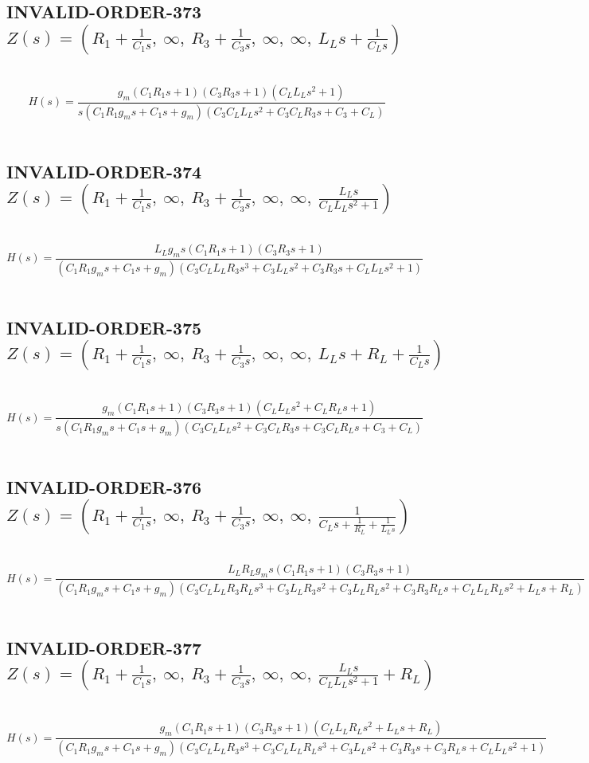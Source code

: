 \documentclass{article}
\begin{document}
\subsection{INVALID-ORDER-373 $Z(s) = \left( R_{1} + \frac{1}{C_{1} s}, \  \infty, \  R_{3} + \frac{1}{C_{3} s}, \  \infty, \  \infty, \  L_{L} s + \frac{1}{C_{L} s}\right)$ } \ 
\textbf{\[H(s) = \frac{g_{m} \left(C_{1} R_{1} s + 1\right) \left(C_{3} R_{3} s + 1\right) \left(C_{L} L_{L} s^{2} + 1\right)}{s \left(C_{1} R_{1} g_{m} s + C_{1} s + g_{m}\right) \left(C_{3} C_{L} L_{L} s^{2} + C_{3} C_{L} R_{3} s + C_{3} + C_{L}\right)}\] } \ 
\subsection{INVALID-ORDER-374 $Z(s) = \left( R_{1} + \frac{1}{C_{1} s}, \  \infty, \  R_{3} + \frac{1}{C_{3} s}, \  \infty, \  \infty, \  \frac{L_{L} s}{C_{L} L_{L} s^{2} + 1}\right)$ } \ 
\textbf{\[H(s) = \frac{L_{L} g_{m} s \left(C_{1} R_{1} s + 1\right) \left(C_{3} R_{3} s + 1\right)}{\left(C_{1} R_{1} g_{m} s + C_{1} s + g_{m}\right) \left(C_{3} C_{L} L_{L} R_{3} s^{3} + C_{3} L_{L} s^{2} + C_{3} R_{3} s + C_{L} L_{L} s^{2} + 1\right)}\] } \ 
\subsection{INVALID-ORDER-375 $Z(s) = \left( R_{1} + \frac{1}{C_{1} s}, \  \infty, \  R_{3} + \frac{1}{C_{3} s}, \  \infty, \  \infty, \  L_{L} s + R_{L} + \frac{1}{C_{L} s}\right)$ } \ 
\textbf{\[H(s) = \frac{g_{m} \left(C_{1} R_{1} s + 1\right) \left(C_{3} R_{3} s + 1\right) \left(C_{L} L_{L} s^{2} + C_{L} R_{L} s + 1\right)}{s \left(C_{1} R_{1} g_{m} s + C_{1} s + g_{m}\right) \left(C_{3} C_{L} L_{L} s^{2} + C_{3} C_{L} R_{3} s + C_{3} C_{L} R_{L} s + C_{3} + C_{L}\right)}\] } \ 
\subsection{INVALID-ORDER-376 $Z(s) = \left( R_{1} + \frac{1}{C_{1} s}, \  \infty, \  R_{3} + \frac{1}{C_{3} s}, \  \infty, \  \infty, \  \frac{1}{C_{L} s + \frac{1}{R_{L}} + \frac{1}{L_{L} s}}\right)$ } \ 
\textbf{\[H(s) = \frac{L_{L} R_{L} g_{m} s \left(C_{1} R_{1} s + 1\right) \left(C_{3} R_{3} s + 1\right)}{\left(C_{1} R_{1} g_{m} s + C_{1} s + g_{m}\right) \left(C_{3} C_{L} L_{L} R_{3} R_{L} s^{3} + C_{3} L_{L} R_{3} s^{2} + C_{3} L_{L} R_{L} s^{2} + C_{3} R_{3} R_{L} s + C_{L} L_{L} R_{L} s^{2} + L_{L} s + R_{L}\right)}\] } \ 
\subsection{INVALID-ORDER-377 $Z(s) = \left( R_{1} + \frac{1}{C_{1} s}, \  \infty, \  R_{3} + \frac{1}{C_{3} s}, \  \infty, \  \infty, \  \frac{L_{L} s}{C_{L} L_{L} s^{2} + 1} + R_{L}\right)$ } \ 
\textbf{\[H(s) = \frac{g_{m} \left(C_{1} R_{1} s + 1\right) \left(C_{3} R_{3} s + 1\right) \left(C_{L} L_{L} R_{L} s^{2} + L_{L} s + R_{L}\right)}{\left(C_{1} R_{1} g_{m} s + C_{1} s + g_{m}\right) \left(C_{3} C_{L} L_{L} R_{3} s^{3} + C_{3} C_{L} L_{L} R_{L} s^{3} + C_{3} L_{L} s^{2} + C_{3} R_{3} s + C_{3} R_{L} s + C_{L} L_{L} s^{2} + 1\right)}\] } \ 
\end{document}
